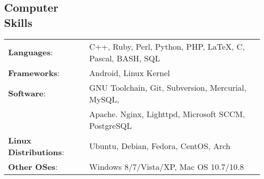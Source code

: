 \documentclass[margin]{res}
\begin{document}
\begin{resume}
    \section{Computer \\ Skills}
      \begin{tabular}{l p{3.6in}}
        \textbf{Languages}:           & C++, Ruby, Perl, Python, PHP, \LaTeX, C, Pascal, BASH, SQL \\ [1pt]
        \textbf{Frameworks}:          & Android, Linux Kernel \\ [1pt]
        \textbf{Software}:            & GNU Toolchain, Git, Subversion, Mercurial, MySQL, \\
                                      & Apache. Nginx, Lighttpd, Microsoft SCCM, PostgreSQL \\ [1pt]
        \textbf{Linux Distributions}: & Ubuntu, Debian, Fedora, CentOS, Arch \\ [1pt]
        \textbf{Other OSes}:          & Windows 8/7/Vista/XP, Mac OS 10.7/10.8 \\ [1pt]
      \end{tabular}

  \end{resume} 
\end{document}
